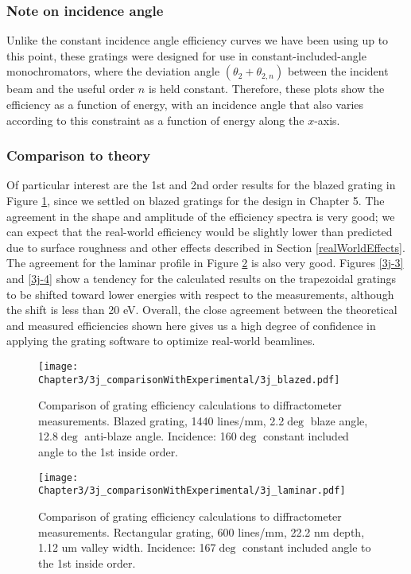 \subsubsection{Note on incidence angle}
Unlike the constant incidence angle efficiency curves we have been using up to this point, these gratings were designed for use in constant-included-angle monochromators, where the deviation angle $(\theta_2 + \theta_{2,n})$ between the incident beam and the useful order $n$ is held constant.  Therefore, these plots show the efficiency as a function of energy, with an incidence angle that also varies according to this constraint as a function of energy along the $x$-axis.

\subsubsection{Comparison to theory}
Of particular interest are the 1st and 2nd order results for the blazed grating in Figure \ref{3j-1}, since we settled on blazed gratings for the design in Chapter 5.  The agreement in the shape and amplitude of the efficiency spectra is very good; we can expect that the real-world efficiency would be slightly lower than predicted due to surface roughness and other effects described in Section \ref{realWorldEffects}.  The agreement for the laminar profile in Figure \ref{3j-2} is also very good.  Figures \ref{3j-3} and \ref{3j-4} show a tendency for the calculated results on the trapezoidal gratings to be shifted toward lower energies with respect to the measurements, although the shift is less than 20 eV.  Overall, the close agreement between the theoretical and measured efficiencies shown here gives us a high degree of confidence in applying the grating software to optimize real-world beamlines.
 
\begin{figure}[htbp] %
   \centering
   \texttt{[image: Chapter3/3j\_comparisonWithExperimental/3j\_blazed.pdf]} 
   \caption{Comparison of grating efficiency calculations to diffractometer measurements.  Blazed grating, 1440 lines/mm, 2.2$\deg$ blaze angle, 12.8$\deg$ anti-blaze angle. Incidence: 160$\deg$ constant included angle to the 1st inside order.}
   \label{3j-1}
\end{figure}

\begin{figure}[htbp] %
   \centering
   \texttt{[image: Chapter3/3j\_comparisonWithExperimental/3j\_laminar.pdf]} 
   \caption{Comparison of grating efficiency calculations to diffractometer measurements.  Rectangular grating, 600 lines/mm, 22.2 nm depth, 1.12 um valley width.  Incidence: 167$\deg$ constant included angle to the 1st inside order.}
   \label{3j-2}
\end{figure}

